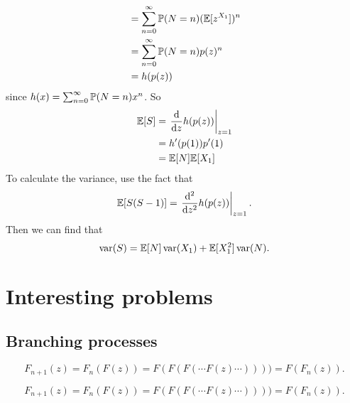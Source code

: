 \begin{note}
\begin{field}
\begin{eg}
\begin{align*}
      &= \sum_{n = 0}^\infty \P(N = n) (\E[z^{X_1}])^n\\
      &= \sum_{n = 0}^\infty \P(N = n) p(z)^n \\
      &= h(p(z))
    \end{align*}
    since $h(x) = \sum_{n = 0}^\infty \P(N = n) x^n$.
    So
    \begin{align*}
      \E[S] &= \left.\frac{\d }{\d z}h(p(z))\right|_{z = 1}\\
      &= h'(p(1))p'(1)\\
      &= \E[N]\E[X_1]
    \end{align*}
    To calculate the variance, use the fact that
    \[
      \E[S(S - 1)] = \left.\frac{\d ^2}{\d z^2}h(p(z))\right|_{z = 1}.
    \]
    Then we can find that
    \[
      \var (S) = \E[N]\var(X_1) + \E[X_1^2]\var(N).
    \]
    \end{eg}
  \end{field}
  \xplain{}%
\end{note}

\section{Interesting problems}

\subsection{Branching processes}

\begin{note}
  \begin{field}
    \begin{thm}
      \[
        F_{n + 1}(z) = F_n(F(z)) = F(F(F(\cdots F(z) \cdots )))) = F(F_n(z)).
      \]
    \end{thm}
  \end{field}
  \begin{field}
    \begin{thm}
      \[
        F_{n + 1}(z) = F_n(F(z)) = F(F(F(\cdots F(z) \cdots )))) = F(F_n(z)).
      \]
    \end{thm}
  \end{field}
  \xplain{}%
\end{note}


